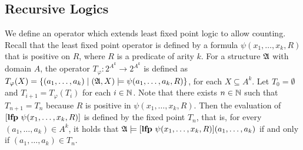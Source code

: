 \subsection{Recursive Logics}

We define an operator which extends least fixed point logic \cite{I86,vardi1982complexity} to allow counting. Recall that the least fixed point operator is defined by a formula $\psi(x_1,\ldots,x_k,R)$ that is positive on $R$, where $R$  is a predicate of arity $k$. For a structure $\mathfrak{A}$ with domain $A$, the operator $T_{\varphi}:2^{A^k} \to 2^{A^k}$ is defined as $T_{\varphi}(X) = \{(a_1,\ldots,a_k)\mid (\mathfrak{A},X)\models \psi(a_1,\ldots,a_k,R) \}$, for each $X\subseteq A^k$. Let $T_0 = \emptyset$ and $T_{i+1} = T_{\varphi}(T_i)$ for each $i \in \mathbb{N}$. Note that there exists $n\in \mathbb{N}$ such that $T_{n+1} = T_n$ because $R$ is positive in $\psi(x_1,\ldots,x_k,R)$. Then the evaluation of $[{\bf lfp} \,\,\psi(x_1,\ldots,x_k,R)]$ is defined by the fixed point $T_n$, that is, for every $(a_1,\ldots,a_k)\in A^k$, it holds that $\mathfrak{A}\models[{\bf lfp} \,\,\psi(x_1,\ldots,x_k,R)](a_1,\ldots,a_k)$ if and only if $(a_1,\ldots,a_k) \in T_n$.

